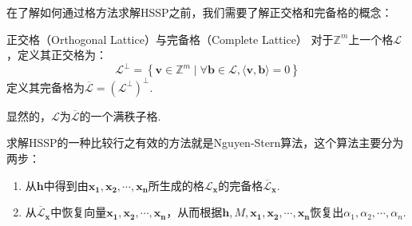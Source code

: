 \documentclass{book}
\numberwithin{equation}{subsubsection}
\begin{document}
在了解如何通过格方法求解HSSP之前，我们需要了解正交格和完备格的概念：

\begin{concept}{正交格（Orthogonal Lattice）与完备格（Complete Lattice）}
    对于$\mathbb{Z}^m$上一个格$\mathcal{L}$，定义其正交格为：
    \begin{equation}
        \mathcal{L}^{\bot}=\left\{\pmb{v}\in\mathbb{Z}^m\mid\forall\pmb{b}\in\mathcal{L},\langle\pmb{v},\pmb{b}\rangle=0\right\}
        \nonumber
    \end{equation}
    定义其完备格为$\overline{\mathcal{L}}=(\mathcal{L}^{\bot})^{\bot}$.
\end{concept}

显然的，$\mathcal{L}$为$\overline{\mathcal{L}}$的一个满秩子格.\par
求解HSSP的一种比较行之有效的方法就是Nguyen-Stern算法，这个算法主要分为两步：
\begin{enumerate}
    \item 从$\pmb{h}$中得到由$\pmb{x_1},\pmb{x_2},\cdots,\pmb{x_n}$所生成的格$\mathcal{L}_{\pmb{x}}$的完备格$\overline{\mathcal{L}}_{\pmb{x}}$.
    \item 从$\overline{\mathcal{L}}_{\pmb{x}}$中恢复向量$\pmb{x_1},\pmb{x_2},\cdots,\pmb{x_n}$，从而根据$\pmb{h},M,\pmb{x_1},\pmb{x_2},\cdots,\pmb{x_n}$恢复出$\alpha_1,\alpha_2,\cdots,\alpha_n$.
\end{enumerate}
\end{document}
